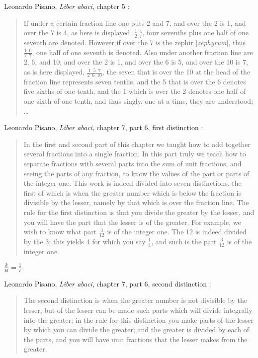 \documentclass{article}
\theoremstyle{definition}
\begin{document}
Leonardo Pisano, {\em Liber abaci}, chapter 5 \cite[p.~50]{abaci}:

\begin{quote}
If under a certain fraction line one puts 2 and 7, and over the
2 is 1, and over the 7 is 4, as here is displayed, $\frac{1 \enspace 4}{2 \enspace 7}$, four sevenths plus one half
of one seventh are denoted. However if over the 7 is the zephir [{\em zephyrum}], thus $\frac{1 \enspace 0}{2 \enspace 7}$, one
half of one seventh is denoted. Also under another fraction line are 2, 6, and 10;
and over the 2 is 1, and over the 6 is 5, and over the 10 is 7, as is here displayed,
$\frac{1 \enspace 5 \enspace 7}{2 \enspace 6 \enspace 10}$,
the seven that is over the 10 at the head of the fraction line represents
seven tenths, and the 5 that is over the 6 denotes five sixths of one tenth, and
the 1 which is over the 2 denotes one half of one sixth of one tenth, and thus
singly, one at a time, they are understood; \ldots
\end{quote}

Leonardo Pisano, {\em Liber abaci}, chapter 7, part 6, first distinction \cite[p.~119]{abaci}:

\begin{quote}
In the first and second part of this chapter we taught how to add together several fractions into a single fraction.
In this part truly we teach how to
separate fractions with several parts into the sum of unit fractions, and seeing
the parts of any fraction, to know the values of the part or parts of the
integer one. This work is indeed divided into seven distinctions, the first of
which is when the greater number which is below the fraction is divisible by
the lesser, namely by that which is over the fraction line. The rule for the first
distinction is that you divide the greater by the lesser, and you will have the
part that the lesser is of the greater. For example, we wish to know what
part $\frac{3}{12}$ is of the integer one. The 12 is indeed divided by the 3; this yields 4 for
which you say $\frac{1}{4}$, and such is the part $\frac{3}{12}$ is of the integer one.
\end{quote}

$\frac{k}{kl} = \frac{1}{l}$

Leonardo Pisano, {\em Liber abaci}, chapter 7, part 6, second distinction \cite[p.~119]{abaci}:

\begin{quote}
The second distinction is when the greater number is not divisible by the
lesser, but of the lesser can be made such parts which will divide integrally into
the greater; in the rule for this distinction you make parts of the lesser by which
you can divide the greater; and the greater is divided by each of the parts, and
you will have unit fractions that the lesser makes from the greater.
\end{quote}
\end{document}
